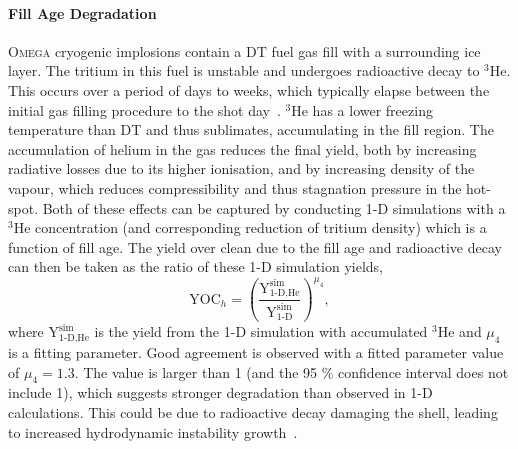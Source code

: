\paragraph*{Fill Age Degradation}
\textsc{Omega} cryogenic implosions contain a DT fuel gas fill with a surrounding ice layer.
The tritium in this fuel is unstable and undergoes radioactive decay to ${}^{3}\text{He}$.
This occurs over a period of days to weeks, which typically elapse between the initial gas filling procedure to the shot day~\cite{regan_national_2019}.
${}^{3}\text{He}$ has a lower freezing temperature than DT and thus sublimates, accumulating in the fill region.
The accumulation of helium in the gas reduces the final yield, both by increasing radiative losses due to its higher ionisation, and by increasing density of the vapour, which reduces compressibility and thus stagnation pressure in the hot-spot.
Both of these effects can be captured by conducting 1-D simulations with a ${}^{3}\text{He}$ concentration (and corresponding reduction of tritium density) which is a function of fill age.
The yield over clean due to the fill age and radioactive decay can then be taken as the ratio of these 1-D simulation yields,
\begin{equation}
    \text{YOC}_h = \left( \frac{\text{Y}^{\text{sim}}_{1\text{-D,He}}}{\text{Y}^{\text{sim}}_{1\text{-D}}} \right)^{\mu_4},
\end{equation}
where $\text{Y}^{\text{sim}}_{1\text{-D,He}}$ is the yield from the 1-D simulation with accumulated ${}^{3}\text{He}$ and $\mu_4$ is a fitting parameter.
Good agreement is observed with a fitted parameter value of $\mu_4 = 1.3$.
The value is larger than 1 (and the 95 \% confidence interval does not include 1), which suggests stronger degradation than observed in 1-D calculations.
This could be due to radioactive decay damaging the shell, leading to increased hydrodynamic instability growth~\cite{lees_understanding_2023}.

